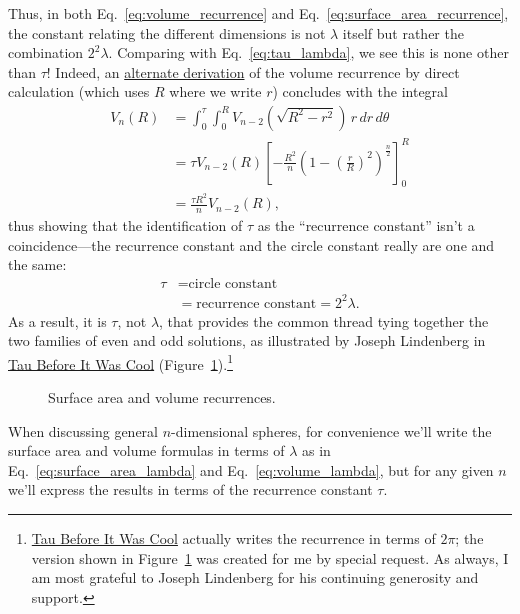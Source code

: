 Thus, in both Eq.~\eqref{eq:volume_recurrence} and Eq.~\eqref{eq:surface_area_recurrence}, the constant relating the different dimensions is not $\lambda$ itself but rather the combination $2^2\lambda$. Comparing with Eq.~\eqref{eq:tau_lambda}, we see this is none other than $\tau$! Indeed, an \href{https://en.wikipedia.org/wiki/Volume_of_an_n-ball#The_two-dimension_recursion_formula}{alternate derivation} of the volume recurrence by direct calculation (which uses $R$ where we write $r$) concludes with the integral
\begin{equation}
\label{eq:integral_recurrence}
\begin{split}
V_n(R) & = \int_0^\tau \int_0^R V_{n-2}\left(\sqrt{R^2 - r^2}\right) \,r\,dr\,d\theta \\
       & = \tau V_{n-2}(R) \left[-\frac{R^2}{n}\left(1 - \left(\frac{r}{R}\right)^2\right)^\frac{n}{2}\right]_{0}^{R} \\
       & = \frac{\tau R^2}{n} V_{n-2}(R),
\end{split}
\end{equation}
thus showing that the identification of $\tau$ as the ``recurrence constant'' isn't a coincidence---the recurrence constant and the circle constant really are one and the same:
\[
\begin{split}
\tau & = \mbox{circle constant} \\
     & = \mbox{recurrence constant} = 2^2\lambda.
\end{split}
\]
As a result, it is $\tau$, not $\lambda$, that provides the common thread tying together the two families of even and odd solutions, as illustrated by Joseph Lindenberg in \href{http://sites.google.com/site/taubeforeitwascool/}{Tau Before It Was Cool} (Figure~\ref{fig:Nspheres}).\footnote{\href{http://sites.google.com/site/taubeforeitwascool/}{Tau Before It Was Cool} actually writes the recurrence in terms of $2\pi$; the version shown in Figure~\ref{fig:Nspheres} was created for me by special request. As always, I am most grateful to Joseph Lindenberg for his continuing generosity and support.}

\begin{figure}
\begin{center}
\end{center}
\caption{Surface area and volume recurrences.\label{fig:Nspheres}}
\end{figure}

When discussing general $n$-dimensional spheres, for convenience \linebreak we'll write the surface area and volume formulas in terms of $\lambda$ as in Eq.~\eqref{eq:surface_area_lambda} and Eq.~\eqref{eq:volume_lambda}, but for any given $n$ we'll express the results in terms of the recurrence constant $\tau$.


